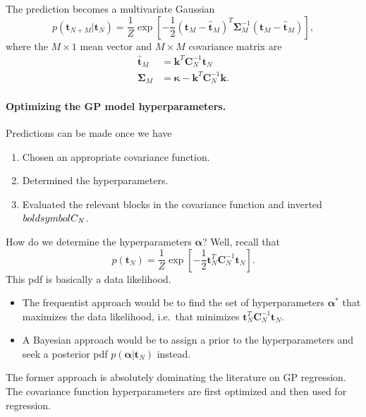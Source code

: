 \documentclass[%
oneside,                 %
final,                   %
10pt]{article}
\begin{document}
The prediction becomes a multivariate Gaussian
\[
p \left( \boldsymbol{t}_{N+M} | \boldsymbol{t}_N \right) = \frac{1}{Z} \exp
\left[
-\frac{1}{2} \left( \boldsymbol{t}_M - \hat{\boldsymbol{t}}_M \right)^T \boldsymbol{\Sigma}_M^{-1} \left( \boldsymbol{t}_M - \hat{\boldsymbol{t}}_M \right)
\right],
\]
where the $M \times 1$ mean vector and $M \times M$ covariance matrix are
\begin{align*}
\hat{\boldsymbol{t}}_M &= \boldsymbol{k}^T \boldsymbol{C}_N^{-1} \boldsymbol{t}_N \\
\boldsymbol{\Sigma}_M &= \boldsymbol{\kappa} - \boldsymbol{k}^T \boldsymbol{C}_N^{-1} \boldsymbol{k}.
\end{align*}


\paragraph{Optimizing the GP model hyperparameters.}
Predictions can be made once we have
\begin{enumerate}
\item Chosen an appropriate covariance function.

\item Determined the hyperparameters.

\item Evaluated the relevant blocks in the covariance function and inverted $\\boldsymbol{C}_N$.
\end{enumerate}

\noindent
How do we determine the hyperparameters $\boldsymbol{\alpha}$? Well, recall that
\[
p \left( \boldsymbol{t}_N \right) = \frac{1}{Z} \exp \left[ -\frac{1}{2} \boldsymbol{t}_N^T \boldsymbol{C}_{N}^{-1} \boldsymbol{t}_N 
\right].
\]
This pdf is basically a data likelihood.

\begin{itemize}
\item The frequentist approach would be to find the set of hyperparameters $\boldsymbol{\alpha}^*$ that maximizes the data likelihood, i.e.~that minimizes $\boldsymbol{t}_N^T \boldsymbol{C}_{N}^{-1} \boldsymbol{t}_N$.

\item A Bayesian approach would be to assign a prior to the hyperparameters and seek a posterior pdf $p(\boldsymbol{\alpha} | \boldsymbol{t}_N)$ instead.
\end{itemize}

\noindent
The former approach is absolutely dominating the literature on GP regression. The covariance function hyperparameters are first optimized and then used for regression.



\end{document}
